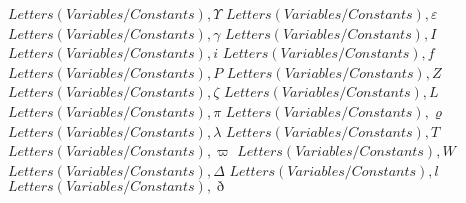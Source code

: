 \documentclass{article}
\begin{document}
$Letters (Variables/Constants),\Upsilon$
\linebreak
\linebreak
$Letters (Variables/Constants),\varepsilon$
\linebreak
\linebreak
$Letters (Variables/Constants),\gamma$
\linebreak
\linebreak
$Letters (Variables/Constants),I$
\linebreak
\linebreak
$Letters (Variables/Constants),i$
\linebreak
\linebreak
$Letters (Variables/Constants),f$
\linebreak
\linebreak
$Letters (Variables/Constants),P$
\linebreak
\linebreak
$Letters (Variables/Constants),Z$
\linebreak
\linebreak
$Letters (Variables/Constants),\zeta$
\linebreak
\linebreak
$Letters (Variables/Constants),L$
\linebreak
\linebreak
$Letters (Variables/Constants),\pi$
\linebreak
\linebreak
$Letters (Variables/Constants),\varrho$
\linebreak
\linebreak
$Letters (Variables/Constants),\lambda$
\linebreak
\linebreak
$Letters (Variables/Constants),T$
\linebreak
\linebreak
$Letters (Variables/Constants),\varpi$
\linebreak
\linebreak
$Letters (Variables/Constants),W$
\linebreak
\linebreak
$Letters (Variables/Constants),\Delta$
\linebreak
\linebreak
$Letters (Variables/Constants),l$
\linebreak
\linebreak
$Letters (Variables/Constants),\eth$
\linebreak
\linebreak
\end{document}
